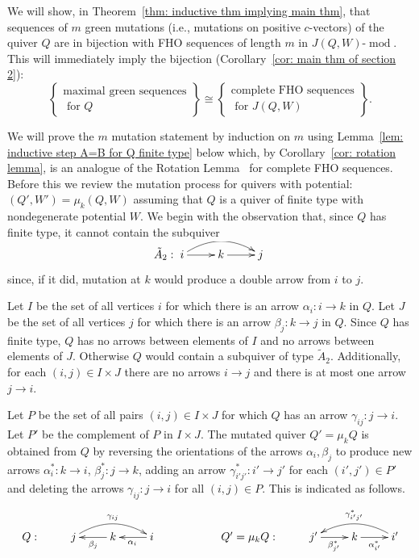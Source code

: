 \documentclass[10pt]{amsart}
\theoremstyle{definition}
\DeclareMathOperator{\modr}{mod}
\begin{document}
We will show, in Theorem~\ref{thm: inductive thm implying main thm}, that sequences of $m$ green mutations (i.e., mutations on positive $c$-vectors) of the quiver $Q$ are in bijection with FHO sequences of length $m$ in $J(Q,W)\text{-}\modr $. This will immediately imply the bijection (Corollary~\ref{cor: main thm of section 2}):
\[
	\left\{\begin{array}{cc}
	\text{maximal green sequences}\\
	\text{ for $Q$}
	\end{array}
	\right\}
\cong 
	\left\{\begin{array}{cc}
	\text{complete FHO sequences}\\
	\text{ for $J(Q,W)$}
	\end{array}
	\right\}.
\]



We will prove the $m$ mutation statement by induction on $m$ using Lemma~\ref{lem: inductive step A=B for Q finite type} below which, by Corollary~\ref{cor: rotation lemma}, is an analogue of the Rotation Lemma~\cite{BHIT} for complete FHO sequences. Before this we review the mutation process for quivers with potential: $(Q',W')=\mu_k(Q,W)$ assuming that $Q$ is a quiver of finite type with nondegenerate potential $W$. We begin with the observation that, since $Q$ has finite type, it cannot contain the subquiver 
\[
	\tilde A_2:\xymatrix{ i\ar@/^1pc/[rr]\ar[r] &k\ar[r] & j}
\]
since, if it did, mutation at $k$ would produce a double arrow from $i$ to $j$.


Let $I$ be the set of all vertices $i$ for which there is an arrow $\alpha_i:i\to k$ in $Q$. Let $J$ be the set of all vertices $j$ for which there is an arrow $\beta_j:k\to j$ in $Q$. Since $Q$ has finite type, $Q$ has no arrows between elements of $I$ and no arrows between elements of $J$. Otherwise $Q$ would contain a subquiver of type $\tilde A_2$. Additionally, for each $(i, j) \in  I \times J$ there are no arrows $i \rightarrow j$ and there is at most one arrow $j \rightarrow i$.



Let $P$ be the set of all pairs $(i,j)\in I\times J$ for which $Q$ has an arrow $\gamma_{ij}:j\to i$. Let $P'$ be the complement of $P$ in $I\times J$. The mutated quiver $Q'=\mu_kQ$ is obtained from $Q$ by reversing the orientations of the arrows $\alpha_i,\beta_j$ to produce new arrows $\alpha_i^\ast:k\to i$, $\beta_j^\ast:j\to k$, adding an arrow $\gamma_{i'j'}^\ast:i'\to j'$ for each $(i',j')\in P'$ and deleting the arrows $\gamma_{ij}:j\to i$ for all $(i,j)\in P$. This is indicated as follows.%
\[
\xymatrix{%
Q: & j\ar@/^1pc/[rr]^{\gamma_{ij}} &k\ar[l]^{\beta_j} & i\ar[l]^{\alpha_i}%
&& Q'=\mu_k Q: & j'\ar[r]_{\beta_{j'}^\ast}%
&k \ar[r]_{\alpha_{i'}^\ast} & i'\ar@/_1pc/[ll]_{\gamma_{i'j'}^\ast}
	}%
\]
\end{document}
